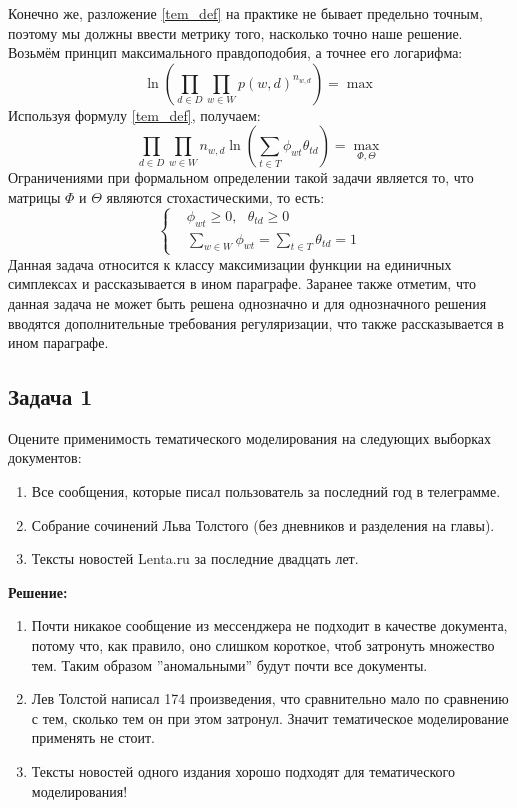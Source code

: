 Конечно же, разложение \eqref{tem_def} на практике не бывает предельно точным, поэтому мы должны ввести метрику того, насколько точно наше решение. Возьмём принцип максимального правдоподобия, а точнее его логарифма:
\begin{equation}
    \ln\left(\prod\limits_{d\in D}\prod\limits_{w\in W} p(w, d)^{n_{w,d}}\right) = \max
\end{equation}
Используя формулу \eqref{tem_def}, получаем:
\begin{equation}
    \prod\limits_{d\in D}\prod\limits_{w\in W}n_{w,d} \ln\left(\sum\limits_{t\in T} \phi_{wt} \theta_{td}\right) = \max\limits_{\Phi, \Theta}
\end{equation}
Ограничениями при формальном определении такой задачи является то, что матрицы $\Phi$ и $\Theta$ являются стохастическими, то есть:
\begin{equation}
    \left\{
    \begin{aligned}
         & \phi_{wt} \geq 0, ~~~\theta_{td} \geq 0                 \\
         & \sum_{w\in W} \phi_{wt} = \sum_{t\in T} \theta_{td} = 1
    \end{aligned}
    \right.
\end{equation}
Данная задача относится к классу максимизации функции на единичных симплексах и рассказывается в ином параграфе. Заранее также отметим, что данная задача не может быть решена однозначно и для однозначного решения вводятся дополнительные требования регуляризации, что также рассказывается в ином параграфе.

\subsection*{Задача 1}
Оцените применимость тематического моделирования на следующих выборках документов:
\begin{enumerate}
    \item Все сообщения, которые писал пользователь за последний год в телеграмме.
    \item Собрание сочинений Льва Толстого (без дневников и разделения на главы).
    \item Тексты новостей Lenta.ru за последние двадцать лет.
\end{enumerate}
\textbf{Решение:}
\begin{enumerate}
    \item Почти никакое сообщение из мессенджера не подходит в качестве документа, потому что, как правило, оно слишком короткое, чтоб затронуть множество тем. Таким образом ''аномальными'' будут почти все документы.
    \item Лев Толстой написал 174 произведения, что сравнительно мало по сравнению с тем, сколько тем он при этом затронул. Значит тематическое моделирование применять не стоит.
    \item Тексты новостей одного издания хорошо подходят для тематического моделирования!
\end{enumerate}


